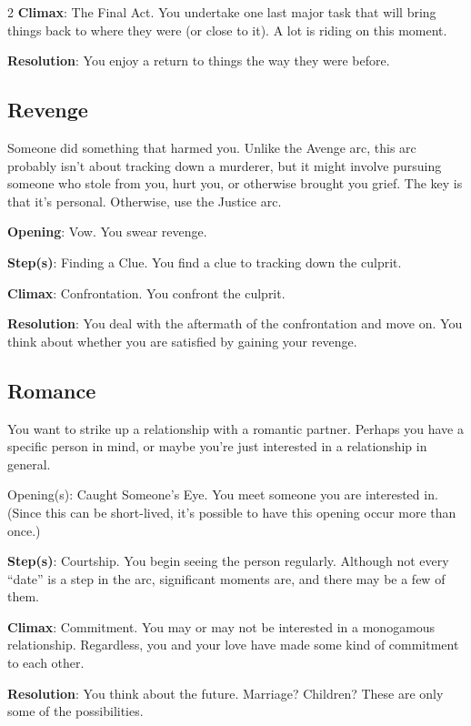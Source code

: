 \begin{multicols}{2}
\textbf{Climax}: The Final Act. You undertake one last major task that will bring things back to where they were (or close to it). A lot is riding on this moment. 

\textbf{Resolution}: You enjoy a return to things the way they were before.

\subsection{Revenge}

Someone did something that harmed you. Unlike the Avenge arc, this arc probably isn’t about tracking down a murderer, but it might involve pursuing someone who stole from you, hurt you, or otherwise brought you grief. The key is that it’s personal. Otherwise, use the Justice arc. 

\textbf{Opening}: Vow. You swear revenge.

\textbf{Step(s)}: Finding a Clue. You find a clue to tracking down the culprit.

\textbf{Climax}: Confrontation. You confront the culprit. 

\textbf{Resolution}: You deal with the aftermath of the confrontation and move on. You think about whether you are satisfied by gaining your revenge.

\subsection{Romance}

You want to strike up a relationship with a romantic partner. Perhaps you have a specific person in mind, or maybe you’re just interested in a relationship in general.

Opening(s): Caught Someone’s Eye. You meet someone you are interested in. (Since this can be short-lived, it’s possible to have this opening occur more than once.)

\textbf{Step(s)}: Courtship. You begin seeing the person regularly. Although not every “date” is a step in the arc, significant moments are, and there may be a few of them.

\textbf{Climax}: Commitment. You may or may not be interested in a monogamous relationship. Regardless, you and your love have made some kind of commitment to each other. 

\textbf{Resolution}: You think about the future. Marriage? Children? These are only some of the possibilities. 


\end{multicols}
